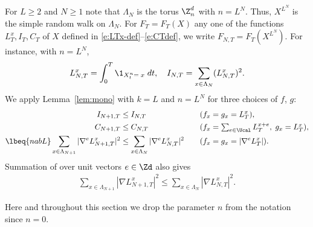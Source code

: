 For $L \geq 2$ and $N \geq 1$
note that $\Lambda_N$ is the torus $\Z^d_n$ with $n=L^N$.
Thus, $X^{L^N}$ is the simple random walk on $\Lambda_N$.
For $F_T = F_T(X)$ any one of the functions $L_T^x,I_T,C_T$
of $X$ defined in \eqref{e:LTx-def}--\eqref{e:CTdef},
we write $F_{N,T} = F_T(X^{L^N})$. For instance, with $n=L^N$,
\begin{equation}
    L^x_{N,T} = \int_0^T \1_{X^{n}_t=\;x} \; dt,
    \quad I_{N,T} = \sum_{x \in \Lambda_N}(L_{N,T}^x)^2 .
\end{equation}
We apply Lemma~\ref{lem:mono} with $k = L$ and $n = L^N$ for three
choices of $f$, $g$:
\begin{alignat}{2}
\label{e:ILT-mon}
I_{N+1,T} &\leq I_{N,T}
	\quad
&&(f_x=g_x=L_T^x),
	\\
\label{e:CSA-mon}
C_{N+1,T} &\leq C_{N,T}
	\quad
&&(f_x=\textstyle{\sum_{e\in \Ucal}L_T^{x+e}},\; g_x=L_T^x),
	\\
\lbeq{nabL}
\sum_{x\in\Lambda_{N+1}} |\nabla^e L^x_{N+1,T}|^2
	&\leq
\sum_{x\in\Lambda_N} |\nabla^e L^x_{N,T}|^2
	\quad
&& (f_x = g_x = \left|\nabla^e L_T^x\right|).
\end{alignat}
Summation of  over unit vectors $e\in\Zd$ also gives
\begin{align}
\label{e:gradLT-mon}
\sum_{x\in\Lambda_{N+1}} |\nabla L^x_{N+1,T}|^2
  \leq
\sum_{x\in\Lambda_N} |\nabla L^x_{N,T}|^2.
\end{align}

Here and throughout this section we drop the parameter $n$
from the notation since $n = 0$.

